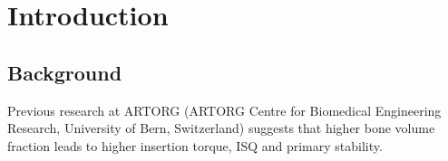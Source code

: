 \documentclass[12pt, a4paper, twoside]{report}
\begin{document}
\tableofcontents
\mainmatter
\clearpage       
%
%
%
%
%
%
%
\chapter{Introduction}
%
\section{Background}

%
%
%
%

Previous research at ARTORG (ARTORG Centre for Biomedical Engineering Research, University of Bern, Switzerland)\cite{voumard_peroperative_2019, ovesy_nonlinear_2018} suggests that higher bone volume fraction leads to higher insertion torque, ISQ and primary stability.
\end{document}
